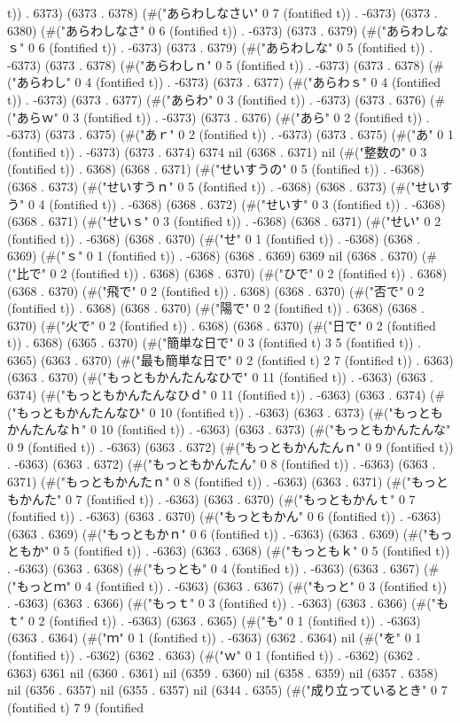 t)) . 6373) (6373 . 6378) (#("あらわしなさい" 0 7 (fontified t)) . -6373) (6373 . 6380) (#("あらわしなさ" 0 6 (fontified t)) . -6373) (6373 . 6379) (#("あらわしなｓ" 0 6 (fontified t)) . -6373) (6373 . 6379) (#("あらわしな" 0 5 (fontified t)) . -6373) (6373 . 6378) (#("あらわしｎ" 0 5 (fontified t)) . -6373) (6373 . 6378) (#("あらわし" 0 4 (fontified t)) . -6373) (6373 . 6377) (#("あらわｓ" 0 4 (fontified t)) . -6373) (6373 . 6377) (#("あらわ" 0 3 (fontified t)) . -6373) (6373 . 6376) (#("あらｗ" 0 3 (fontified t)) . -6373) (6373 . 6376) (#("あら" 0 2 (fontified t)) . -6373) (6373 . 6375) (#("あｒ" 0 2 (fontified t)) . -6373) (6373 . 6375) (#("あ" 0 1 (fontified t)) . -6373) (6373 . 6374) 6374 nil (6368 . 6371) nil (#("整数の" 0 3 (fontified t)) . 6368) (6368 . 6371) (#("せいすうの" 0 5 (fontified t)) . -6368) (6368 . 6373) (#("せいすうｎ" 0 5 (fontified t)) . -6368) (6368 . 6373) (#("せいすう" 0 4 (fontified t)) . -6368) (6368 . 6372) (#("せいす" 0 3 (fontified t)) . -6368) (6368 . 6371) (#("せいｓ" 0 3 (fontified t)) . -6368) (6368 . 6371) (#("せい" 0 2 (fontified t)) . -6368) (6368 . 6370) (#("せ" 0 1 (fontified t)) . -6368) (6368 . 6369) (#("ｓ" 0 1 (fontified t)) . -6368) (6368 . 6369) 6369 nil (6368 . 6370) (#("比で" 0 2 (fontified t)) . 6368) (6368 . 6370) (#("ひで" 0 2 (fontified t)) . 6368) (6368 . 6370) (#("飛で" 0 2 (fontified t)) . 6368) (6368 . 6370) (#("否で" 0 2 (fontified t)) . 6368) (6368 . 6370) (#("陽で" 0 2 (fontified t)) . 6368) (6368 . 6370) (#("火で" 0 2 (fontified t)) . 6368) (6368 . 6370) (#("日で" 0 2 (fontified t)) . 6368) (6365 . 6370) (#("簡単な日で" 0 3 (fontified t) 3 5 (fontified t)) . 6365) (6363 . 6370) (#("最も簡単な日で" 0 2 (fontified t) 2 7 (fontified t)) . 6363) (6363 . 6370) (#("もっともかんたんなひで" 0 11 (fontified t)) . -6363) (6363 . 6374) (#("もっともかんたんなひｄ" 0 11 (fontified t)) . -6363) (6363 . 6374) (#("もっともかんたんなひ" 0 10 (fontified t)) . -6363) (6363 . 6373) (#("もっともかんたんなｈ" 0 10 (fontified t)) . -6363) (6363 . 6373) (#("もっともかんたんな" 0 9 (fontified t)) . -6363) (6363 . 6372) (#("もっともかんたんｎ" 0 9 (fontified t)) . -6363) (6363 . 6372) (#("もっともかんたん" 0 8 (fontified t)) . -6363) (6363 . 6371) (#("もっともかんたｎ" 0 8 (fontified t)) . -6363) (6363 . 6371) (#("もっともかんた" 0 7 (fontified t)) . -6363) (6363 . 6370) (#("もっともかんｔ" 0 7 (fontified t)) . -6363) (6363 . 6370) (#("もっともかん" 0 6 (fontified t)) . -6363) (6363 . 6369) (#("もっともかｎ" 0 6 (fontified t)) . -6363) (6363 . 6369) (#("もっともか" 0 5 (fontified t)) . -6363) (6363 . 6368) (#("もっともｋ" 0 5 (fontified t)) . -6363) (6363 . 6368) (#("もっとも" 0 4 (fontified t)) . -6363) (6363 . 6367) (#("もっとｍ" 0 4 (fontified t)) . -6363) (6363 . 6367) (#("もっと" 0 3 (fontified t)) . -6363) (6363 . 6366) (#("もっｔ" 0 3 (fontified t)) . -6363) (6363 . 6366) (#("もｔ" 0 2 (fontified t)) . -6363) (6363 . 6365) (#("も" 0 1 (fontified t)) . -6363) (6363 . 6364) (#("ｍ" 0 1 (fontified t)) . -6363) (6362 . 6364) nil (#("を" 0 1 (fontified t)) . -6362) (6362 . 6363) (#("ｗ" 0 1 (fontified t)) . -6362) (6362 . 6363) 6361 nil (6360 . 6361) nil (6359 . 6360) nil (6358 . 6359) nil (6357 . 6358) nil (6356 . 6357) nil (6355 . 6357) nil (6344 . 6355) (#("成り立っているとき" 0 7 (fontified t) 7 9 (fontified 